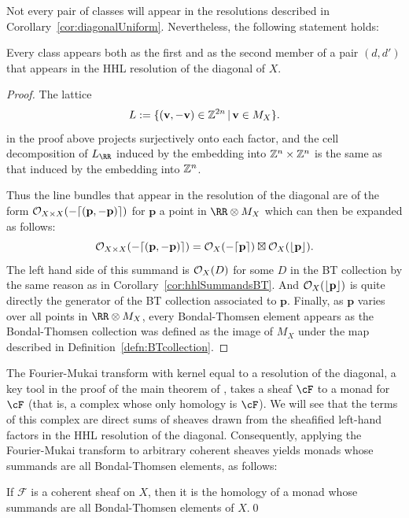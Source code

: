 \documentclass{amsart}
\begin{document}
Not every pair of \BT classes will appear in the resolutions described in Corollary~\ref{cor:diagonalUniform}.
Nevertheless, the following statement holds:
\begin{cor}\label{cor:diagonal-BTcollection}
Every \BT class appears both as the first and as the second member of a pair $(d,d')$ that appears in the HHL resolution of the diagonal of $X$. \end{cor}
\begin{proof}
The lattice 
\[
L := \{(\mathbf{v},-\mathbf{v}) \in \mathbb Z^{2n} \,|\, \mathbf{v}\in M_X\}.
\] 
in the proof above projects surjectively onto each factor, and the cell decomposition of $L_{\RR}$
induced by the embedding into $\mathbb Z^{n}\times \mathbb Z^{n}$ is the same as that induced by the embedding into
$\mathbb Z^{n}$.
  
  Thus the line bundles that appear in the resolution of the diagonal are of the form ${\mathcal O}_{X\times X}(-\lceil (\mathbf{p},-\mathbf{p})\rceil)$ for $\mathbf{p}$ a point in $\RR \otimes M_X$ which can then be expanded as follows:
  \[{\mathcal O}_{X\times X}(-\lceil (\mathbf{p},-\mathbf{p})\rceil)={\mathcal O}_X(-\lceil \mathbf{p}\rceil)\boxtimes {\mathcal O}_X(\lfloor \mathbf{p}\rfloor).\]
  The left hand side of this summand is ${\mathcal O}_X(D)$ for some $D$ in the BT collection by the same reason as in Corollary~\ref{cor:hhlSummandsBT}. And ${\mathcal O}_X(\lfloor \mathbf{p}\rfloor)$ is quite directly the generator of the BT collection associated to $\mathbf{p}$. Finally, as $\mathbf{p}$ varies over all points in $\RR \otimes M_X$, every Bondal-Thomsen element appears as the Bondal-Thomsen collection was defined as the image of $M_X$ under the map described in Definition~\ref{defn:BTcollection}.
\end{proof}

The Fourier-Mukai transform with kernel equal to a resolution of the diagonal,  a key tool in the proof of the main theorem of \cite{BES}, takes a sheaf $\cF$ to a monad for $\cF$ (that is, a complex whose only homology is $\cF$).  We will see  that the terms of this complex are direct sums of sheaves
 drawn from the sheafified left-hand factors in the HHL resolution of the diagonal. Consequently, applying the Fourier-Mukai transform to arbitrary coherent sheaves yields monads whose summands are all Bondal-Thomsen elements, as follows:

\begin{cor}
  If $\mathcal{F}$ is a coherent sheaf on $X$, then it is the homology of a monad whose summands are all Bondal-Thomsen elements of $X$.\qed
\end{cor}
\end{document}
